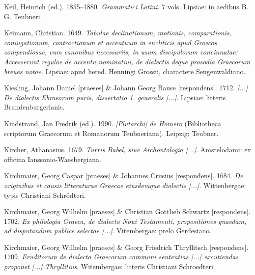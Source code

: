 \begin{styleStandard}
Keil, Heinrich (ed.). 1855–1880. \textit{Grammatici Latini}. 7 vols. Lipsiae: in aedibus B. G. Teubneri.
\end{styleStandard}

\begin{styleStandard}
Keimann, Christian. 1649. \textit{Tabulae declinationum, motionis, comparationis, coniugationum, contractionum et accentuum in encliticis apud Graecos compendiosae, cum canonibus necessariis, in usum discipulorum concinnatae: Accesserunt regulae de accentu nominatiui, de dialectis deque prosodia Graecorum breues notae}. Lipsiae: apud hered. Henningi Grossii, charactere Sengenwaldiano.
\end{styleStandard}

\begin{styleStandard}
Kiesling, Johann Daniel [praeses] \& Johann Georg Bause [respondens]. 1712. \textit{[...] De dialectis Ebraeorum puris, dissertatio 1. generalis [...]}. Lipsiae: litteris Brandenburgerianis.
\end{styleStandard}

\begin{styleStandard}
Kindstrand, Jan Fredrik (ed.). 1990. \textit{[Plutarchi] de Homero} (Bibliotheca scriptorum Graecorum et Romanorum Teubneriana). Leipzig: Teubner.
\end{styleStandard}

\begin{styleStandard}
Kircher, Athanasius. 1679. \textit{Turris Babel, siue Archontologia [...]}. Amstelodami: ex officina Ianssonio-Waesbergiana.
\end{styleStandard}

\begin{styleStandard}
Kirchmaier, Georg Caspar [praeses] \& Johannes Crusius [respondens]. 1684. \textit{De originibus et causis litteraturae Graecae eiusdemque dialectis [...]}. Wittenbergae: typis Christiani Schrödteri.
\end{styleStandard}

\begin{styleStandard}
Kirchmaier, Georg Wilhelm [praeses] \& Christian Gottlieb Schwartz [respondens]. 1702. \textit{Ex philologia Graeca, de dialecto Noui Testamenti, propositiones quaedam, ad disputandum publice selectae [...]}. Vitembergae: prelo Gerdesiano.
\end{styleStandard}

\begin{styleStandard}
Kirchmaier, Georg Wilhelm [praeses] \& Georg Friedrich Thryllitsch [respondens]. 1709. \textit{Eruditorum de dialecto Graecorum communi sententias [...] excutiendas proponet [...] Thryllitius}. Witembergae: litteris Christiani Schroedteri.
\end{styleStandard}

